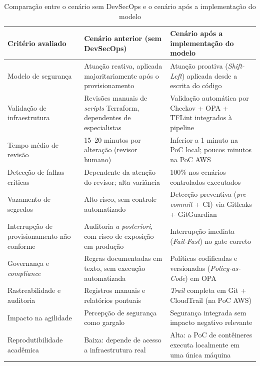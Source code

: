 \begin{table}[!ht]
\centering
\caption{Comparação entre o cenário sem DevSecOps e o cenário após a implementação do modelo}
\label{tab:comparacao_antes_depois}
\renewcommand{\arraystretch}{1.3}
\begin{tabular}{|p{3.6cm}|p{5.5cm}|p{5.5cm}|}
\hline
\textbf{Critério avaliado} & \textbf{Cenário anterior (sem DevSecOps)} & \textbf{Cenário após a implementação do modelo} \\
\hline
Modelo de segurança & Atuação reativa, aplicada majoritariamente após o provisionamento & Atuação proativa (\textit{Shift-Left}) aplicada desde a escrita do código \\
\hline
Validação de infraestrutura & Revisões manuais de \textit{scripts} Terraform, dependentes de especialistas & Validação automática por Checkov + OPA + TFLint integrados à pipeline \\
\hline
Tempo médio de revisão & 15--20 minutos por alteração (revisor humano) & Inferior a 1 minuto na PoC local; poucos minutos na PoC AWS \\
\hline
Detecção de falhas críticas & Dependente da atenção do revisor; alta variância & 100\% nos cenários controlados executados \\
\hline
Vazamento de segredos & Alto risco, sem controle automatizado & Detecção preventiva (\textit{pre-commit} + CI) via Gitleaks + GitGuardian \\
\hline
Interrupção de provisionamento não conforme & Auditoria \textit{a posteriori}, com risco de exposição em produção & Interrupção imediata (\textit{Fail-Fast}) no gate correto \\
\hline
Governança e \textit{compliance} & Regras documentadas em texto, sem execução automatizada & Políticas codificadas e versionadas (\textit{Policy-as-Code}) em OPA \\
\hline
Rastreabilidade e auditoria & Registros manuais e relatórios pontuais & \textit{Trail} completa em Git + CloudTrail (na PoC AWS) \\
\hline
Impacto na agilidade & Percepção de segurança como gargalo & Segurança integrada sem impacto negativo relevante \\
\hline
Reprodutibilidade acadêmica & Baixa: depende de acesso a infraestrutura real & Alta: a PoC de contêineres executa localmente em uma única máquina \\
\hline
\end{tabular}
\end{table}

